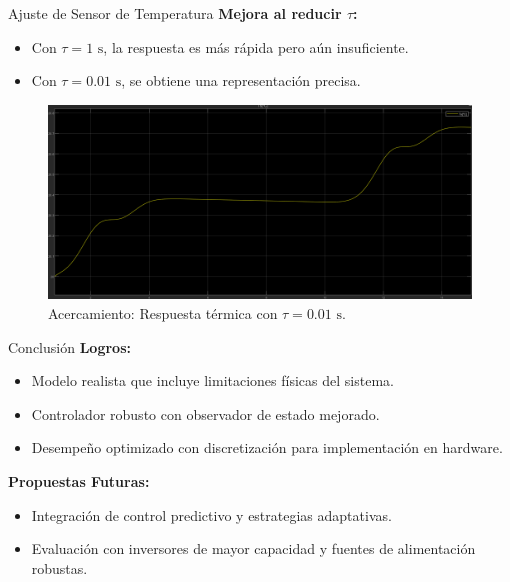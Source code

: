 \documentclass[12pt]{beamer}
\begin{document}
\begin{frame}{Ajuste de Sensor de Temperatura}
        \textbf{Mejora al reducir \(\tau\):}
        \begin{itemize}
            \item Con \(\tau = 1 \text{ s}\), la respuesta es más rápida pero aún insuficiente.
            \item Con \(\tau = 0.01 \text{ s}\), se obtiene una representación precisa.
        \end{itemize}

        \begin{figure}
            \centering
            \includegraphics[width=1\textwidth]{Imagenes/14_tmpNI_01_acercamiento.png}
            \caption{Acercamiento: Respuesta térmica con \(\tau = 0.01 \text{ s}\).}
        \end{figure}
\end{frame}


\begin{frame}{Conclusión}
\textbf{Logros:}
\begin{itemize}
    \item Modelo realista que incluye limitaciones físicas del sistema.
    \item Controlador robusto con observador de estado mejorado.
    \item Desempeño optimizado con discretización para implementación en hardware.
\end{itemize}

\textbf{Propuestas Futuras:}
\begin{itemize}
    \item Integración de control predictivo y estrategias adaptativas.
    \item Evaluación con inversores de mayor capacidad y fuentes de alimentación robustas.
\end{itemize}
\end{frame}
\end{document}
